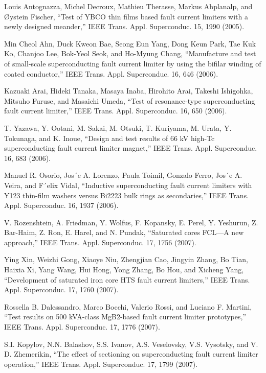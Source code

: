 \noindent [9.131] Louis Antognazza, Michel Decroux, Mathieu Therasse, Markus Abplanalp, and Øystein Fischer, ``Test of YBCO thin films based fault current limiters with a newly designed meander,” IEEE Trans. Appl. Superconduc. 15, 1990 (2005).

\noindent [9.132] Min Cheol Ahn, Duck Kweon Bae, Seong Eun Yang, Dong Keun Park, Tae Kuk
Ko, Chanjoo Lee, Bok-Yeol Seok, and Ho-Myung Chang, ``Manufacture and test
of small-scale superconducting fault current limiter by using the bifilar winding
of coated conductor,” IEEE Trans. Appl. Superconduc. 16, 646 (2006).

\noindent [9.133] Kazuaki Arai, Hideki Tanaka, Masaya Inaba, Hirohito Arai, Takeshi Ishigohka,
Mitsuho Furuse, and Masaichi Umeda, ``Test of resonance-type superconducting
fault current limiter,” IEEE Trans. Appl. Superconduc. 16, 650 (2006).

\noindent [9.134] T. Yazawa, Y. Ootani, M. Sakai, M. Otsuki, T. Kuriyama, M. Urata, Y. Tokunaga,
and K. Inoue, ``Design and test results of 66 kV high-Tc superconducting fault
current limiter magnet,” IEEE Trans. Appl. Superconduc. 16, 683 (2006).

\noindent [9.135] Manuel R. Osorio, Jos´e A. Lorenzo, Paula Toimil, Gonzalo Ferro, Jos´e A. Veira,
and F´elix Vidal, ``Inductive superconducting fault current limiters with Y123
thin-film washers versus Bi2223 bulk rings as secondaries,” IEEE Trans. Appl.
Superconduc. 16, 1937 (2006).

\noindent [9.136] V. Rozenshtein, A. Friedman, Y. Wolfus, F. Kopansky, E. Perel, Y. Yeshurun,
Z. Bar-Haim, Z. Ron, E. Harel, and N. Pundak, ``Saturated cores FCL—A new
approach,” IEEE Trans. Appl. Superconduc. 17, 1756 (2007).

\noindent [9.137] Ying Xin, Weizhi Gong, Xiaoye Niu, Zhengjian Cao, Jingyin Zhang, Bo Tian,
Haixia Xi, Yang Wang, Hui Hong, Yong Zhang, Bo Hou, and Xicheng Yang,
``Development of saturated iron core HTS fault current limiters,” IEEE Trans.
Appl. Superconduc. 17, 1760 (2007).

\noindent [9.138] Rossella B. Dalessandro, Marco Bocchi, Valerio Rossi, and Luciano F. Martini,
``Test results on 500 kVA-class MgB2-based fault current limiter prototypes,”
IEEE Trans. Appl. Superconduc. 17, 1776 (2007).

\noindent [9.139] S.I. Kopylov, N.N. Balashov, S.S. Ivanov, A.S. Veselovsky, V.S. Vysotsky, and V.
D. Zhemerikin, ``The effect of sectioning on superconducting fault current limiter
operation,” IEEE Trans. Appl. Superconduc. 17, 1799 (2007).


